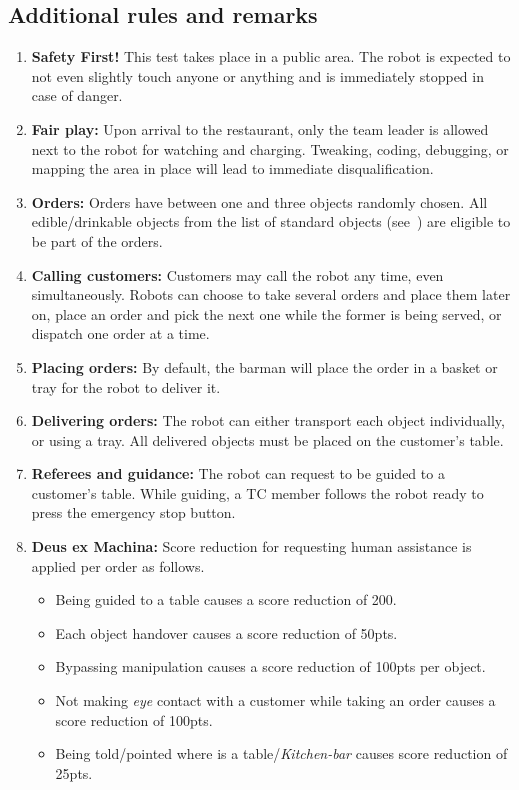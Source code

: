 \subsection{Additional rules and remarks}
\begin{enumerate}[nosep]
	\item \textbf{Safety First!} This test takes place in a public area. The robot is expected to not even slightly touch anyone or anything and is immediately stopped in case of danger.

	\item \textbf{Fair play:} Upon arrival to the restaurant, only the team leader is allowed next to the robot for watching and charging.
	Tweaking, coding, debugging, or mapping the area in place will lead to immediate disqualification.

	\item \textbf{Orders:} Orders have between one and three objects randomly chosen.
	All edible/drinkable objects from the list of standard objects (see~) are eligible to be part of the orders.

	\item \textbf{Calling customers:} Customers may call the robot any time, even simultaneously.
	Robots can choose to take several orders and place them later on, place an order and pick the next one while the former is being served, or dispatch one order at a time.

	\item \textbf{Placing orders:} By default, the barman will place the order in a basket or tray for the robot to deliver it.

	\item \textbf{Delivering orders:} The robot can either transport each object individually, or using a tray. All delivered objects must be placed on the customer's table.

	\item \textbf{Referees and guidance:} The robot can request to be guided to a customer's table. While guiding, a TC member follows the robot ready to press the emergency stop button.

    \item \textbf{Deus ex Machina:} Score reduction for requesting human assistance is applied per order as follows.
	\begin{itemize}[nosep]
		\item Being guided to a table causes a score reduction of 200.
		\item Each object handover causes a score reduction of 50pts.
		\item Bypassing manipulation causes a score reduction of 100pts per object.
		\item Not making \emph{eye} contact with a customer while taking an order causes a score reduction of 100pts.
		\item Being told/pointed where is a table/\textit{Kitchen-bar} causes score reduction of 25pts.
	\end{itemize}


\end{enumerate}
